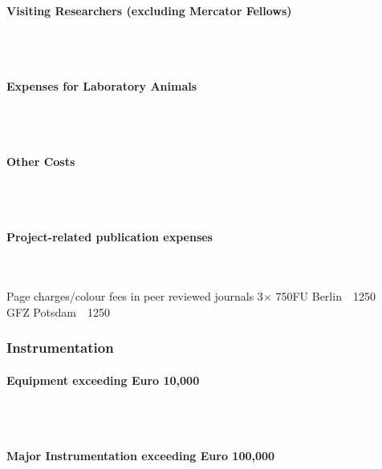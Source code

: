 \documentclass[11pt]{article}
\providecommand{\currfilename}{}
\newcommand{\myparagraph}[1]{\paragraph{#1}\mbox{}\\}
\newcommand{\showfile}{{\bf \tt \color{blue} \currfilename}}
\newcommand{\note}[1]{{\it \color{red} #1}}
\newcommand{\note}[1]{}
\newcommand{\showfile}{}
\begin{document}
\myparagraph{Visiting Researchers (excluding Mercator Fellows)	}
\showfile

\myparagraph{Expenses for Laboratory Animals}
\showfile

\myparagraph{Other Costs}
\showfile

\myparagraph{Project-related publication expenses}
\showfile\\
Page charges/colour fees in peer reviewed journals 3$\times$ 750\texteuro \hfill FU Berlin\ \ 1250\texteuro\\
\mbox{}\hfill 	 \hfill GFZ Potsdam\ \ 1250\texteuro
\subsubsection{Instrumentation}
\myparagraph{Equipment exceeding Euro 10,000}
\showfile

\myparagraph{Major Instrumentation exceeding Euro 100,000}
\showfile

% 
% 
% 
% 
% 

\end{document}

